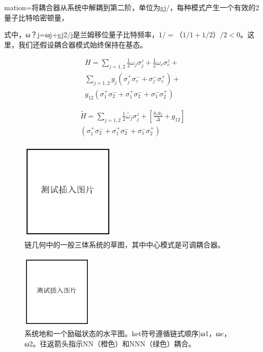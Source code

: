 \documentclass[11pt,twocolumn]{ctexart}
\begin{document}
mation=将耦合器从系统中解耦到第二阶，单位为gj/，每种模式产生一个有效的2量子比特哈密顿量，

式中，ω？j=ωj+gj2/j是兰姆移位量子比特频率，$1/=（1/1+1/2）/2<0$。这里，我们还假设耦合器模式始终保持在基态。

\begin{equation}
\begin{split}
H =\sum_{j=1,2} \frac{1}{2} \omega_j \sigma_j^z + \frac{1}{2} \omega_c  \sigma_c^z +  \\ \sum_{j=1,2} g_j (\sigma_j^{+} \sigma_c^{-} + \sigma_j^{-} \sigma_c^{+}) +  \\ g_{12}(\sigma_1^{+}\sigma_2 ^{-} +\sigma_1^{+}\sigma_2^{-} + \sigma_1^{-}\sigma_2^{+})
\end{split}
\end{equation}

\begin{equation}
\begin{split}
\widetilde{H} = \sum_{j=1,2} \frac{1}{2} \widetilde{\omega_j} \sigma_j^z +[\frac{g_1 g_2}{\Delta} + g_{12}] \\ (\sigma_1^{+}\sigma_2 ^{-} +\sigma_1^{+}\sigma_2^{-} + \sigma_1^{-}\sigma_2^{+})
\end{split}
\end{equation}


\begin{figure}[h]
\begin{center}
\includegraphics[width=0.4\textwidth]{fig1.png}
\end{center}
\caption{链几何中的一般三体系统的草图，其中中心模式是可调耦合器。}
\label{FIG.1}
\end{figure}

\begin{figure}[h]
\begin{center}
\includegraphics[width=0.3\textwidth]{fig2.png}
\end{center}
\caption{系统地和一个励磁状态的水平图。ket符号遵循链式顺序|ω1，ωc，ω2。往返箭头指示NN（橙色）和NNN（绿色）耦合。}
\label{FIG.2}
\end{figure}
\end{document}
